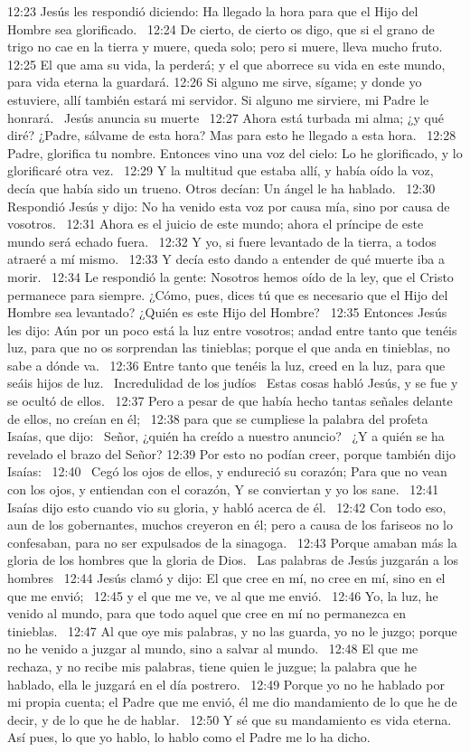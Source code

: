 12:23 Jesús les respondió diciendo: Ha llegado la hora para que el Hijo del Hombre sea glorificado.  
12:24 De cierto, de cierto os digo, que si el grano de trigo no cae en la tierra y muere, queda solo; pero si muere, lleva mucho fruto.  
12:25 El que ama su vida, la perderá; y el que aborrece su vida en este mundo, para vida eterna la guardará. 
12:26 Si alguno me sirve, sígame; y donde yo estuviere, allí también estará mi servidor. Si alguno me sirviere, mi Padre le honrará.  
Jesús anuncia su muerte  
12:27 Ahora está turbada mi alma; ¿y qué diré? ¿Padre, sálvame de esta hora? Mas para esto he llegado a esta hora.  
12:28 Padre, glorifica tu nombre. Entonces vino una voz del cielo: Lo he glorificado, y lo glorificaré otra vez.  
12:29 Y la multitud que estaba allí, y había oído la voz, decía que había sido un trueno. Otros decían: Un ángel le ha hablado.  
12:30 Respondió Jesús y dijo: No ha venido esta voz por causa mía, sino por causa de vosotros.  
12:31 Ahora es el juicio de este mundo; ahora el príncipe de este mundo será echado fuera.  
12:32 Y yo, si fuere levantado de la tierra, a todos atraeré a mí mismo.  
12:33 Y decía esto dando a entender de qué muerte iba a morir.  
12:34 Le respondió la gente: Nosotros hemos oído de la ley, que el Cristo permanece para siempre. ¿Cómo, pues, dices tú que es necesario que el Hijo del Hombre sea levantado? ¿Quién es este Hijo del Hombre?  
12:35 Entonces Jesús les dijo: Aún por un poco está la luz entre vosotros; andad entre tanto que tenéis luz, para que no os sorprendan las tinieblas; porque el que anda en tinieblas, no sabe a dónde va.  
12:36 Entre tanto que tenéis la luz, creed en la luz, para que seáis hijos de luz.  
Incredulidad de los judíos  
Estas cosas habló Jesús, y se fue y se ocultó de ellos.  
12:37 Pero a pesar de que había hecho tantas señales delante de ellos, no creían en él;  
12:38 para que se cumpliese la palabra del profeta Isaías, que dijo:  
Señor, ¿quién ha creído a nuestro anuncio?  
¿Y a quién se ha revelado el brazo del Señor? 
12:39 Por esto no podían creer, porque también dijo Isaías:  
12:40  Cegó los ojos de ellos, y endureció su corazón; Para que no vean con los 
ojos, y entiendan con el corazón, 
Y se conviertan y yo los sane.  
12:41 Isaías dijo esto cuando vio su gloria, y habló acerca de él.  
12:42 Con todo eso, aun de los gobernantes, muchos creyeron en él; pero a causa de los fariseos no lo confesaban, para no ser expulsados de la sinagoga.  
12:43 Porque amaban más la gloria de los hombres que la gloria de Dios.  
Las palabras de Jesús juzgarán a los hombres  
12:44 Jesús clamó y dijo: El que cree en mí, no cree en mí, sino en el que me envió;  
12:45 y el que me ve, ve al que me envió.  
12:46 Yo, la luz, he venido al mundo, para que todo aquel que cree en mí no permanezca en tinieblas.  
12:47 Al que oye mis palabras, y no las guarda, yo no le juzgo; porque no he venido a juzgar al mundo, sino a salvar al mundo.  
12:48 El que me rechaza, y no recibe mis palabras, tiene quien le juzgue; la palabra que he hablado, ella le juzgará en el día postrero.  
12:49 Porque yo no he hablado por mi propia cuenta; el Padre que me envió, él me dio mandamiento de lo que he de decir, y de lo que he de hablar.  
12:50 Y sé que su mandamiento es vida eterna. Así pues, lo que yo hablo, lo hablo como el Padre me lo ha dicho.  
